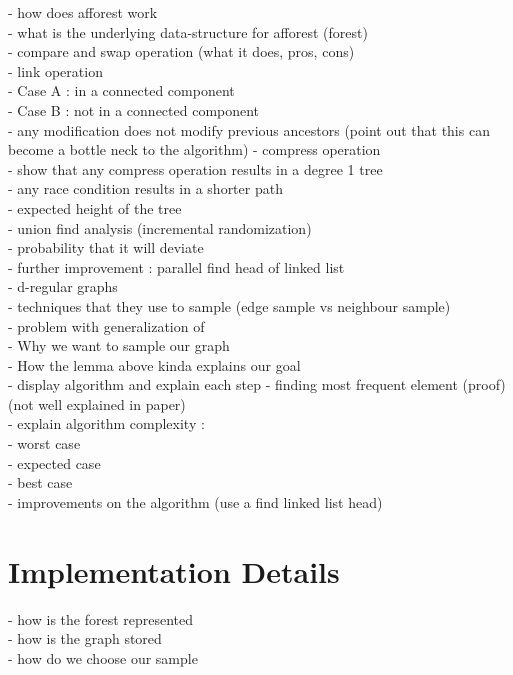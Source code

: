 \documentclass[]{article}
\begin{document}
 
 - how does afforest work\\
 - what is the underlying data-structure for afforest (forest)\\
 - compare and swap operation (what it does, pros, cons)\\
 - link operation\\
 - Case A : in a connected component\\
 - Case B : not in a connected component\\
 - any modification does not modify previous ancestors (point out that this can\\ become a bottle neck to the algorithm)
 - compress operation\\
 - show that any compress operation results in a degree 1 tree\\
 - any race condition results in a shorter path\\
 - expected height of the tree\\
 - union find analysis (incremental randomization) \\
 - probability that it will deviate \\
 - further improvement : parallel find head of linked list\\
 - d-regular graphs\\
 - techniques that they use to sample (edge sample vs neighbour sample)\\
 - problem with generalization of\\
 - Why we want to sample our graph\\
 - How the lemma above kinda explains our goal\\
 - display algorithm and explain each step
 - finding most frequent element (proof) (not well explained in paper)\\
 - explain algorithm complexity :\\
    - worst case\\
    - expected case\\
    - best case\\
- improvements on the algorithm (use a find linked list head)\\
 
 
 
 \section*{Implementation Details}
 - how is the forest represented\\
 - how is the graph stored\\
 - how do we choose our sample\\
 
\end{document}
